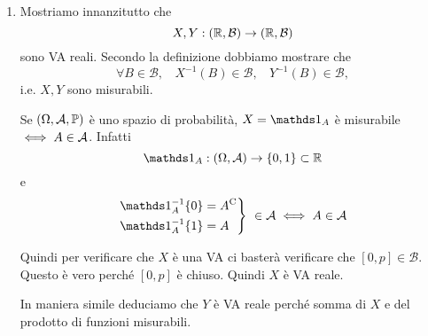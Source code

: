 \ParteSoluzioni

\Soluzione

\begin{enumerate}
\item Mostriamo innanzitutto che
\begin{equation*}
X,Y:(\mathbb{R} ,\mathcal{B})\rightarrow (\mathbb{R} ,\mathcal{B})
\end{equation*}
sono VA reali. Secondo la definizione dobbiamo mostrare che
\begin{equation*}
\forall B\in \mathcal{B} ,\ \ \ \ X^{-1}(B) \in \mathcal{B} ,\ \ \ \ Y^{-1}(B) \in \mathcal{B} ,
\end{equation*}
i.e. $X,Y$ sono misurabili.
\begin{rem}
Se $(\Omega,\mathcal{A},\mathbb{P})$ è uno spazio di probabilità, $X=\Ind_{A}$ è misurabile $\iff A\in \mathcal{A}$. Infatti
\begin{equation*}
\Ind_{A} :(\Omega ,\Ac)\rightarrow \{0,1\} \subset \RR
\end{equation*}
e
\begin{equation*}
\begin{drcases}
\Ind_{A}^{-1}\{0\} =A\complementary\\
\Ind_{A}^{-1}\{1\} =A
\end{drcases}
\ \in \Ac \iff A\in \Ac
\end{equation*}
\end{rem}

Quindi per verificare che $X$ è una VA ci basterà verificare che $[0,p] \in \mathcal{B}$. Questo è vero perché $[0,p]$ è chiuso. Quindi $X$ è VA reale.

In maniera simile deduciamo che $Y$ è VA reale perché somma di $X$ e del prodotto di funzioni misurabili.


\end{enumerate}

